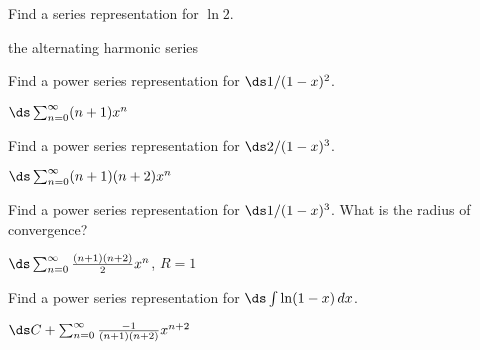 \begin{exercises}

\begin{exercise} Find a series representation for $\ln 2$.
\begin{answer} the alternating harmonic series
\end{answer}\end{exercise}

\begin{exercise} Find a power series representation for $\ds 1/(1-x)^2$.
\begin{answer} $\ds\sum_{n=0}^\infty (n+1)x^n$
\end{answer}\end{exercise}

\begin{exercise} Find a power series representation for $\ds 2/(1-x)^3$.
\begin{answer} $\ds\sum_{n=0}^\infty (n+1)(n+2)x^n$
\end{answer}\end{exercise}

\begin{exercise} Find a power series representation for $\ds 1/(1-x)^3$.
What is the radius of convergence?
\begin{answer} $\ds\sum_{n=0}^\infty {(n+1)(n+2)\over 2}x^n$, $R=1$
\end{answer}\end{exercise}

\begin{exercise} Find a power series representation for $\ds\int\ln(1-x)\,dx$.
\begin{answer} $\ds C+\sum_{n=0}^\infty {-1\over (n+1)(n+2)}x^{n+2}$ 
\end{answer}\end{exercise}

\end{exercises}

